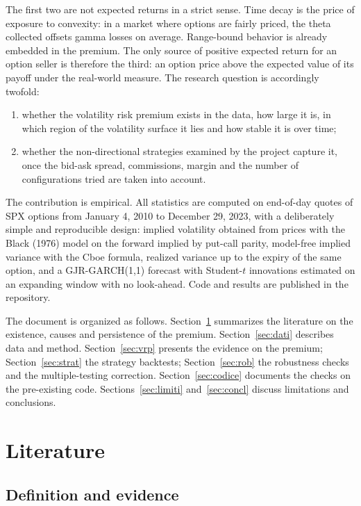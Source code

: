 \documentclass[11pt,a4paper]{article}
\begin{document}
The first two are not expected returns in a strict sense. Time decay is the price of exposure to convexity: in a market where options are fairly priced, the theta collected offsets gamma losses on average. Range-bound behavior is already embedded in the premium. The only source of positive expected return for an option seller is therefore the third: an option price above the expected value of its payoff under the real-world measure. The research question is accordingly twofold:
\begin{enumerate}
\item whether the volatility risk premium exists in the data, how large it is, in which region of the volatility surface it lies and how stable it is over time;
\item whether the non-directional strategies examined by the project capture it, once the bid-ask spread, commissions, margin and the number of configurations tried are taken into account.
\end{enumerate}

The contribution is empirical. All statistics are computed on end-of-day quotes of SPX options from January 4, 2010 to December 29, 2023, with a deliberately simple and reproducible design: implied volatility obtained from prices with the Black (1976) model on the forward implied by put-call parity, model-free implied variance with the Cboe formula, realized variance up to the expiry of the same option, and a GJR-GARCH(1,1) forecast with Student-$t$ innovations estimated on an expanding window with no look-ahead. Code and results are published in the repository.

The document is organized as follows. Section~\ref{sec:lett} summarizes the literature on the existence, causes and persistence of the premium. Section~\ref{sec:dati} describes data and method. Section~\ref{sec:vrp} presents the evidence on the premium; Section~\ref{sec:strat} the strategy backtests; Section~\ref{sec:rob} the robustness checks and the multiple-testing correction. Section~\ref{sec:codice} documents the checks on the pre-existing code. Sections~\ref{sec:limiti} and~\ref{sec:concl} discuss limitations and conclusions.

\section{Literature}\label{sec:lett}

\subsection{Definition and evidence}
\end{document}
